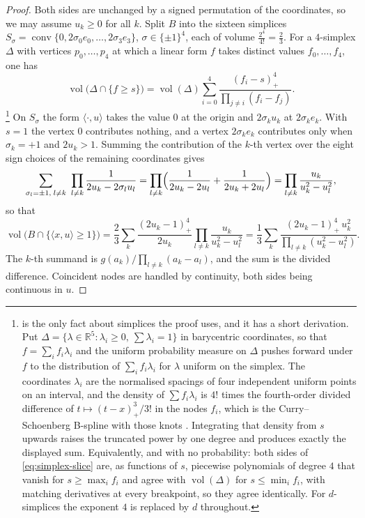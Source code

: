 \documentclass[11pt,reqno]{amsart}
\renewcommand{\_}{\origunderscore\allowbreak}
\numberwithin{equation}{section}
\theoremstyle{plain}
\theoremstyle{definition}
\theoremstyle{remark}
\DeclareMathOperator{\vol}{vol}
\DeclareMathOperator{\conv}{conv}
\begin{document}
\begin{proof}
Both sides are unchanged by a signed permutation of the coordinates, so we
may assume $u_k\ge0$ for all $k$. Split $B$ into the sixteen simplices
$S_\sigma=\conv\{0,2\sigma_0e_0,\dots,2\sigma_3e_3\}$,
$\sigma\in\{\pm1\}^4$, each of volume $\tfrac{2^4}{4!}=\tfrac23$. For a
$4$-simplex $\Delta$ with vertices $p_0,\dots,p_4$ at which a linear form
$f$ takes distinct values $f_0,\dots,f_4$, one has
\begin{equation}\label{eq:simplex-slice}
  \vol\bigl(\Delta\cap\{f\ge s\}\bigr)
  =\vol(\Delta)\sum_{i=0}^{4}\frac{(f_i-s)_+^4}{\prod_{j\ne i}(f_i-f_j)} .
\end{equation}%
\footnote{ is the only fact about simplices the
  proof uses, and it has a short derivation. Put
  $\Delta=\{\lambda\in\mathbb{R}^{5}:\lambda_i\ge0,\ \sum\lambda_i=1\}$
  in barycentric coordinates, so that $f=\sum_i f_i\lambda_i$ and the
  uniform probability measure on $\Delta$ pushes forward under $f$ to
  the distribution of $\sum_i f_i\lambda_i$ for $\lambda$ uniform on the
  simplex. The coordinates $\lambda_i$ are the normalised spacings of
  four independent uniform points on an interval, and the density of
  $\sum f_i\lambda_i$ is $4!$ times the fourth-order divided difference
  of $t\mapsto(t-x)_+^{3}/3!$ in the nodes $f_i$, which is the
  Curry--Schoenberg B-spline with those knots \cite{CSc66}. Integrating
  that density from $s$ upwards raises the truncated power by one degree
  and produces exactly the displayed sum. Equivalently, and with no
  probability: both sides of \cref{eq:simplex-slice} are, as
  functions of $s$, piecewise polynomials of degree $4$ that vanish for
  $s\ge\max_if_i$ and agree with $\vol(\Delta)$ for $s\le\min_if_i$,
  with matching derivatives at every breakpoint, so they agree
  identically. For $d$-simplices the exponent $4$ is replaced by $d$
  throughout.}
On $S_\sigma$ the form $\langle\cdot,u\rangle$ takes the value $0$ at the
origin and $2\sigma_ku_k$ at $2\sigma_ke_k$. With $s=1$ the vertex $0$
contributes nothing, and a vertex $2\sigma_ke_k$ contributes only when
$\sigma_k=+1$ and $2u_k>1$. Summing the contribution of the $k$-th vertex
over the eight sign choices of the remaining coordinates gives
\[
  \sum_{\sigma_l=\pm1,\;l\ne k}\ \prod_{l\ne k}\frac{1}{2u_k-2\sigma_lu_l}
  =\prod_{l\ne k}\Bigl(\frac{1}{2u_k-2u_l}+\frac{1}{2u_k+2u_l}\Bigr)
  =\prod_{l\ne k}\frac{u_k}{u_k^2-u_l^2},
\]
so that
\[
  \vol\bigl(B\cap\{\langle x,u\rangle\ge1\}\bigr)
  =\frac23\sum_{k}\frac{(2u_k-1)_+^4}{2u_k}\prod_{l\ne k}\frac{u_k}{u_k^2-u_l^2}
  =\frac13\sum_{k}\frac{(2u_k-1)_+^4\,u_k^2}{\prod_{l\ne k}(u_k^2-u_l^2)} .
\]
The $k$-th summand is $g(a_k)/\prod_{l\ne k}(a_k-a_l)$, and the sum is the
divided difference. Coincident nodes are handled by continuity, both sides
being continuous in $u$.
\end{proof}
\end{document}
